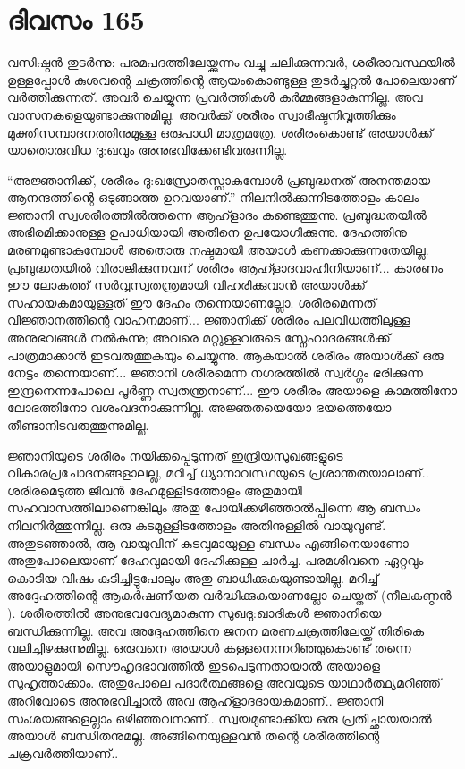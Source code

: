 \section{ദിവസം 165}


വസിഷ്ഠൻ തുടർന്നു: പരമപദത്തിലേയ്ക്കുന്നം വച്ചു ചലിക്കുന്നവർ, ശരീരാവസ്ഥയിൽ ഉള്ളപ്പോൾ കുശവന്റെ ചക്രത്തിന്റെ ആയംകൊണ്ടുള്ള തുടർച്ചുറ്റൽ പോലെയാണ്‌ വർത്തിക്കുന്നത്. അവർ ചെയ്യുന്ന പ്രവർത്തികൾ കർമ്മങ്ങളാകുന്നില്ല. അവ വാസനകളെയുണ്ടാക്കുന്നുമില്ല. അവർക്ക് ശരീരം സ്വാഭീഷ്ടനിവൃത്തിക്കും മുക്തിസമ്പാദനത്തിനുമുള്ള ഒരുപാധി മാത്രമത്രേ. ശരീരംകൊണ്ട് അയാൾക്ക് യാതൊരുവിധ ദു:ഖവും അനുഭവിക്കേണ്ടിവരുന്നില്ല.

“അജ്ഞാനിക്ക്, ശരീരം ദു:ഖസ്രോതസ്സാകുമ്പോൾ പ്രബുദ്ധനത് അനന്തമായ ആനന്ദത്തിന്റെ ഒടുങ്ങാത്ത ഉറവയാണ്‌.” നിലനില്‍ക്കുന്നിടത്തോളം കാലം ജ്ഞാനി സ്വശരീരത്തിൽത്തന്നെ ആഹ്ളാദം കണ്ടെത്തുന്നു. പ്രബുദ്ധതയിൽ അഭിരമിക്കാനുള്ള ഉപാധിയായി അതിനെ ഉപയോഗിക്കുന്നു. ദേഹത്തിനു മരണമുണ്ടാകുമ്പോൾ അതൊരു നഷ്ടമായി അയാൾ കണക്കാക്കുന്നതേയില്ല. പ്രബുദ്ധതയിൽ വിരാജിക്കുന്നവന്‌ ശരീരം ആഹ്ളാദവാഹിനിയാണ്‌... കാരണം ഈ ലോകത്ത് സർവ്വസ്വതന്ത്രമായി വിഹരിക്കുവാൻ അയാൾക്ക് സഹായകമായുള്ളത് ഈ ദേഹം തന്നെയാണല്ലോ. ശരീരമെന്നത് വിജ്ഞാനത്തിന്റെ വാഹനമാണ്‌... ജ്ഞാനിക്ക് ശരീരം പലവിധത്തിലുള്ള അനുഭവങ്ങൾ നല്‍കുന്നു; അവരെ മറ്റുള്ളവരുടെ സ്നേഹാദരങ്ങൾക്ക് പാത്രമാക്കാന്‍ ഇടവരുത്തുകയും ചെയ്യുന്നു. ആകയാൽ ശരീരം അയാൾക്ക് ഒരു നേട്ടം തന്നെയാണ്‌... ജ്ഞാനി ശരീരമെന്ന നഗരത്തിൽ സ്വർഗ്ഗം ഭരിക്കുന്ന ഇന്ദ്രനെന്നപോലെ പൂർണ്ണ സ്വതന്ത്രനാണ്‌... ഈ ശരീരം അയാളെ കാമത്തിനോ ലോഭത്തിനോ വശംവദനാക്കുന്നില്ല. അജ്ഞതയെയോ ഭയത്തെയോ തീണ്ടാനിടവരുത്തുന്നുമില്ല.

ജ്ഞാനിയുടെ ശരീരം നയിക്കപ്പെടുന്നത് ഇന്ദ്രിയസുഖങ്ങളുടെ വികാരപ്രചോദനങ്ങളാലല്ല, മറിച്ച് ധ്യാനാവസ്ഥയുടെ പ്രശാന്തതയാലാണ്‌.. ശരിരമെടുത്ത ജീവൻ ദേഹമുള്ളിടത്തോളം അതുമായി സഹവാസത്തിലാണെങ്കിലും അതു പോയിക്കഴിഞ്ഞാൽപ്പിന്നെ ആ ബന്ധം നിലനിർത്തുന്നില്ല. ഒരു കുടമുള്ളിടത്തോളം അതിനുള്ളിൽ വായുവുണ്ട്. അതുടഞ്ഞാൽ, ആ വായുവിന്‌ കുടവുമായുള്ള ബന്ധം എങ്ങിനെയാണോ അതുപോലെയാണ്‌ ദേഹവുമായി ദേഹിക്കുള്ള ചാർച്ച. പരമശിവനെ ഏറ്റവും കൊടിയ വിഷം കുടിച്ചിട്ടുപോലും അതു ബാധിക്കുകയുണ്ടായില്ല. മറിച്ച് അദ്ദേഹത്തിന്റെ ആകർഷണീയത വർദ്ധിക്കുകയാണല്ലോ ചെയ്തത് (നീലകണ്ഠന്‍ ). ശരീരത്തിൽ അനുഭവവേദ്യമാകുന്ന സുഖദു:ഖാദികൾ ജ്ഞാനിയെ ബന്ധിക്കുന്നില്ല. അവ അദ്ദേഹത്തിനെ ജനന മരണചക്രത്തിലേയ്ക്ക് തിരികെ വലിച്ചിഴക്കുന്നുമില്ല. ഒരുവനെ അയാൾ കള്ളനെന്നറിഞ്ഞുകൊണ്ട് തന്നെ അയാളുമായി സൌഹൃദഭാവത്തില്‍ ഇടപെടുന്നതായാൽ അയാളെ സുഹൃത്താക്കാം. അതുപോലെ പദാർത്ഥങ്ങളെ അവയുടെ യാഥാർത്ഥ്യമറിഞ്ഞ് അറിവോടെ അനുഭവിച്ചാൽ അവ ആഹ്ളാദദായകമാണ്‌.. ജ്ഞാനി സംശയങ്ങളെല്ലാം ഒഴിഞ്ഞവനാണ്‌.. സ്വയമുണ്ടാക്കിയ ഒരു പ്രതിച്ഛായയാൽ അയാൾ ബന്ധിതനുമല്ല. അങ്ങിനെയുള്ളവൻ തന്റെ ശരീരത്തിന്റെ ചക്രവർത്തിയാണ്‌..

